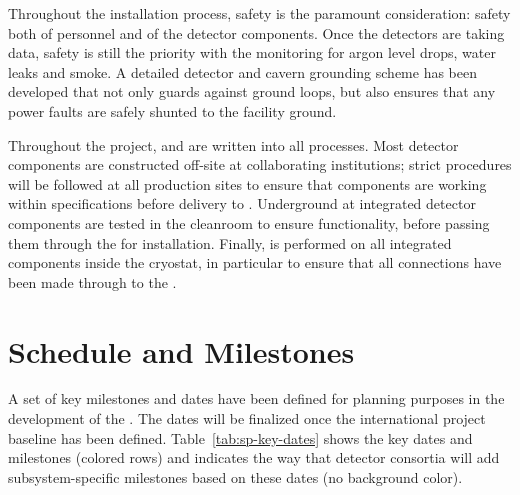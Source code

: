 Throughout the installation process, safety is the paramount consideration: safety both of personnel and of the detector components. Once the detectors are taking data, safety is still the priority with the  monitoring for argon level drops, water leaks and smoke. A detailed detector and cavern grounding scheme has been developed that not only guards against ground loops, but also ensures that any power faults are safely shunted to the facility ground.

Throughout the project,  and  are written into all processes. Most detector components are constructed off-site at collaborating institutions; strict  procedures will be followed at all production sites to ensure that components are working within specifications before delivery to . Underground at  integrated detector components are tested in the cleanroom to ensure functionality, before passing them through the  for installation. Finally,  is performed on all integrated components inside the cryostat, in particular to ensure that all connections have been made through to the .

\section{Schedule and Milestones}
\label{sec:fdsp-exec-sched}


A set of key milestones and dates  have been defined for planning purposes in the development of the .  The dates will be finalized once the international project baseline has been defined.  Table~\ref{tab:sp-key-dates} shows the key dates and milestones (colored rows) and indicates the way that detector consortia will add subsystem-specific milestones based on these dates (no background color).
 
